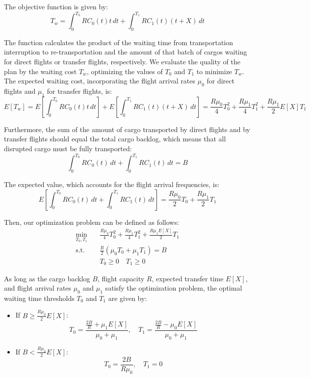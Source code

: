 \documentclass[opre,sglanonrev]{informs4}
\begin{document}
The objective function is given by:
\[ T_w = \int_{0}^{T_0} R C_0(t) t \, dt + \int_{0}^{T_1} R C_1(t) (t + X) \, dt \]

The function calculates the product of the waiting time from transportation interruption to re-transportation and the amount of that batch of cargos waiting for direct flights or transfer flights, respectively. We evaluate the quality of the plan by the waiting cost \( T_w \), optimizing the values of \( T_0 \) and \( T_1 \) to minimize \( T_w \). The expected waiting cost, incorporating the flight arrival rates \(\mu_0\) for direct flights and \(\mu_1\) for transfer flights, is:
\[ E[T_w] = E\left[ \int_{0}^{T_0} R C_0(t) t \, dt \right] + E\left[ \int_{0}^{T_1} R C_1(t) (t + X) \, dt \right] = \frac{R \mu_0}{4} T_0^2 + \frac{R \mu_1}{4} T_1^2 + \frac{R \mu_1}{2} E[X] T_1 \]

Furthermore, the sum of the amount of cargo transported by direct flights and by transfer flights should equal the total cargo backlog, which means that all disrupted cargo must be fully transported:
\[ \int_{0}^{T_0} R C_0(t) \, dt + \int_{0}^{T_1} R C_1(t) \, dt = B \]

The expected value, which accounts for the flight arrival frequencies, is:
\[ E\left[ \int_{0}^{T_0} R C_0(t) \, dt + \int_{0}^{T_1} R C_1(t) \, dt \right] = \frac{R \mu_0}{2} T_0 + \frac{R \mu_1}{2} T_1 \]

Then, our optimization problem can be defined as follows:
\begin{align*}
\min_{T_0, T_1} \quad & \frac{R \mu_0}{4} T_0^2 + \frac{R \mu_1}{4} T_1^2 + \frac{R \mu_1 E[X]}{2} T_1 \\
\text{s.t.} \quad & \frac{R}{2} (\mu_0 T_0 + \mu_1 T_1) = B \\
& T_0 \geq 0
\quad T_1 \geq 0
\end{align*}


\begin{theorem}
	\label{thm:optimal_policy}
    As long as the cargo backlog \( B \), flight capacity \( R \), expected transfer time \( E[X] \), and flight arrival rates \(\mu_0\) and \(\mu_1\) satisfy the optimization problem, the optimal waiting time thresholds \( T_0 \) and \( T_1 \) are given by: \begin{itemize}
        \item If \( B \geq \frac{R \mu_0}{2} E[X] \):
        \[
        T_0 = \frac{\frac{2B}{R} + \mu_1 E[X]}{\mu_0 + \mu_1}, \quad T_1 = \frac{\frac{2B}{R} - \mu_0 E[X]}{\mu_0 + \mu_1}
        \]
        \item If \( B < \frac{R \mu_0}{2} E[X] \):
        \[
        T_0 = \frac{2B}{R \mu_0}, \quad T_1 = 0
        \]
    \end{itemize}
\end{theorem}
\end{document}

